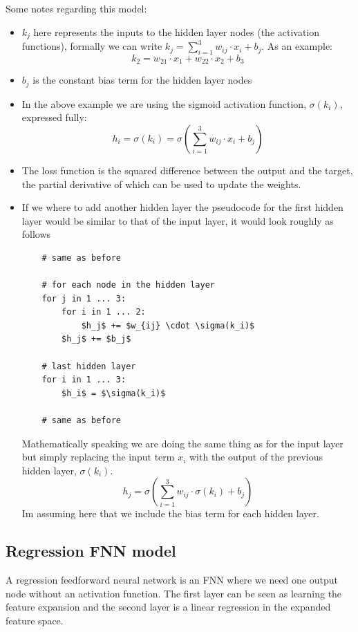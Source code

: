 \documentclass[12pt]{article}
\begin{document}
Some notes regarding this model: 
\begin{itemize}[leftmargin=*, noitemsep]
    \item $k_j$ here represents the inputs to the hidden layer nodes (the activation functions), formally we can write $k_j = \sum_{i=1}^3 w_{ij} \cdot x_i + b_j$. As an example: 
    \[
        k_2 = w_{21} \cdot x_1 + w_{22} \cdot x_2 + b_3
    \]
    \item $b_j$ is the constant bias term for the hidden layer nodes
    \item In the above example we are using the sigmoid activation function, $\sigma(k_i)$, expressed fully: 
    \[
        h_i = \sigma(k_i) = \sigma\left(\sum_{i=1}^3 w_{ij} \cdot x_i + b_j\right)
    \]
    \item The loss function is the squared difference between the output and the target, the partial derivative of which can be used to update the weights.
    \item If we where to add another hidden layer the pseudocode for the first hidden layer would be similar to that of the input layer, it would look roughly as follows 
    \begin{multicols}{2}
        \begin{lstlisting}
    # same as before

    # for each node in the hidden layer
    for j in 1 ... 3: 
        for i in 1 ... 2: 
            $h_j$ += $w_{ij} \cdot \sigma(k_i)$
        $h_j$ += $b_j$

    # last hidden layer
    for i in 1 ... 3:
        $h_i$ = $\sigma(k_i)$

    # same as before
        \end{lstlisting}
        \columnbreak
        Mathematically speaking we are doing the same thing as for the input layer but simply replacing the input term $x_i$ with the output of the previous hidden layer, $\sigma(k_i)$.
        \[
            h_j = \sigma\left(\sum_{i=1}^3 w_{ij} \cdot \sigma(k_i) + b_j\right)  
        \]
        Im assuming here that we include the bias term for each hidden layer.
    \end{multicols}
\end{itemize}

\subsection{Regression FNN model}
\begin{definition}
    A regression feedforward neural network is an FNN where we need one output node without an activation function. The first layer can be seen as learning the feature expansion and the second layer is a linear regression in the expanded feature space.
\end{definition}
\end{document}
